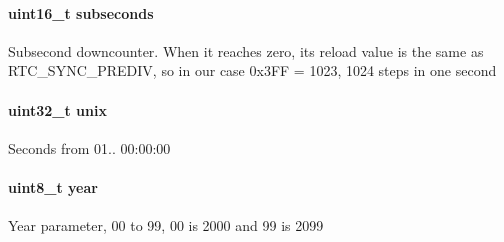 \paragraph[{subseconds}]{\setlength{\rightskip}{0pt plus 5cm}uint16\+\_\+t subseconds}\label{struct_t_m___r_t_c__t_a077301f5916fde6c214879726fec4bc3}
Subsecond downcounter. When it reaches zero, it\textquotesingle{}s reload value is the same as R\+T\+C\+\_\+\+S\+Y\+N\+C\+\_\+\+P\+R\+E\+D\+I\+V, so in our case 0x3\+F\+F = 1023, 1024 steps in one second \hypertarget{struct_t_m___r_t_c__t_a04ff4d1b92a0a093f5fbe7d9c47c6e8c}{}
\paragraph[{unix}]{\setlength{\rightskip}{0pt plus 5cm}uint32\+\_\+t unix}\label{struct_t_m___r_t_c__t_a04ff4d1b92a0a093f5fbe7d9c47c6e8c}
Seconds from 01.. 00\+:00\+:00 \hypertarget{struct_t_m___r_t_c__t_a7af2065789bc84419b8d5fe109be83b5}{}
\paragraph[{year}]{\setlength{\rightskip}{0pt plus 5cm}uint8\+\_\+t year}\label{struct_t_m___r_t_c__t_a7af2065789bc84419b8d5fe109be83b5}
Year parameter, 00 to 99, 00 is 2000 and 99 is 2099 